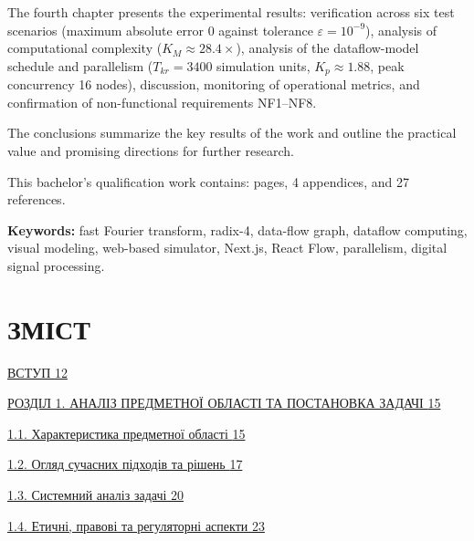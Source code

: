 \documentclass[
]{article}
\begin{document}
The fourth chapter presents the experimental results: verification
across six test scenarios (maximum absolute error \(0\) against
tolerance \(\varepsilon = 10^{- 9}\)), analysis of computational
complexity (\(K_{M} \approx 28.4 \times\)), analysis of the
dataflow-model schedule and parallelism (\(T_{kr} = 3400\) simulation
units, \(K_{p} \approx 1.88\), peak concurrency 16 nodes), discussion,
monitoring of operational metrics, and confirmation of non-functional
requirements NF1--NF8.

The conclusions summarize the key results of the work and outline the
practical value and promising directions for further research.

This bachelor's qualification work contains: pages, 4 appendices, and 27
references.

\textbf{Keywords:} fast Fourier transform, radix-4, data-flow graph,
dataflow computing, visual modeling, web-based simulator, Next.js, React
Flow, parallelism, digital signal processing.

\section{\texorpdfstring{\hfill\break
}{ }}\label{section}

\section{\texorpdfstring{\textbf{ЗМІСТ}}{ЗМІСТ}}\label{ux437ux43cux456ux441ux442}

\hyperref[_Toc230737377]{ВСТУП \hyperref[_Toc230737377]{12}}

\hyperref[_Toc230737378]{РОЗДІЛ 1. АНАЛІЗ ПРЕДМЕТНОЇ ОБЛАСТІ ТА
ПОСТАНОВКА ЗАДАЧІ \hyperref[_Toc230737378]{15}}

\hyperref[X351ee226d926b4af0b1030921408efbb323dbf0]{1.1. Характеристика
предметної області
\hyperref[X351ee226d926b4af0b1030921408efbb323dbf0]{15}}

\hyperref[X92b031453c6d8ed53c9049f3de12fcc4c3dd5ef]{1.2. Огляд сучасних
підходів та рішень
\hyperref[X92b031453c6d8ed53c9049f3de12fcc4c3dd5ef]{17}}

\hyperref[X0ea9e3e4adb39dfbd619c3deeddd6a852a0f153]{1.3. Системний
аналіз задачі \hyperref[X0ea9e3e4adb39dfbd619c3deeddd6a852a0f153]{20}}

\hyperref[Xb0eb9a98447834cee65aa9c07744072b382be46]{1.4. Етичні, правові
та регуляторні аспекти
\hyperref[Xb0eb9a98447834cee65aa9c07744072b382be46]{23}}
\end{document}
